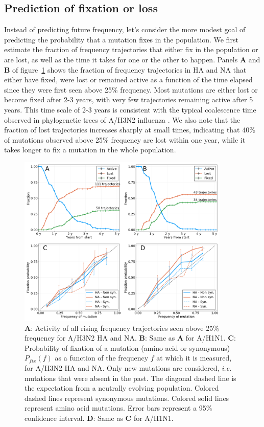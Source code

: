 \documentclass[reprint,amsmath,amssymb,superscriptaddress,showpacs,pre]{revtex4-1}
\begin{document}
\subsection*{Prediction of fixation or loss}
Instead of predicting future frequency, let's consider the more modest goal of predicting the probability that a mutation fixes in the population. 
We first estimate the fraction of frequency trajectories that either fix in the population or are lost, as well as the time it takes for one or the other to happen. 
Panels \textbf{A} and \textbf{B} of figure~\ref{fig:fix_loss_active} shows the fraction of frequency trajectories in HA and NA that either have fixed, were lost or remained active as a function of the time elapsed since they were first seen above 25\% frequency. 
Most mutations are either lost or become fixed after 2-3 years, with very few trajectories remaining active after 5 years.
This time scale of 2-3 years is consistent with the typical coalescence time observed in phylogenetic trees of A/H3N2 influenza \citep{rambaut_genomic_2008,yan_phylodynamic_2019}. 
We also note that the fraction of lost trajectories increases sharply at small times, indicating that 40\% of mutations observed above 25\% frequency are lost within one year, while it takes longer to fix a mutation in the whole population. 

\begin{figure}
	\centering
	\includegraphics[width=0.9\textwidth]{./Figures/Panel2.png}
	\caption{\textbf{A}: Activity of all rising frequency trajectories seen above 25\% frequency for A/H3N2 HA and NA. \textbf{B}: Same as \textbf{A} for A/H1N1. \textbf{C}: Probability of fixation of a mutation (amino acid or synonymous) $P_{fix}(f)$ as a function of the frequency $f$ at which it is measured, for A/H3N2 HA and NA. Only new mutations are considered, \emph{i.e.} mutations that were absent in the past. The diagonal dashed line is the expectation from a neutrally evolving population. Colored dashed lines represent synonymous mutations. Colored solid lines represent amino acid mutations. Error bars represent a 95\% confidence interval. \textbf{D}: Same as \textbf{C} for A/H1N1.}
	\label{fig:fix_loss_active}
\end{figure}
\end{document}
